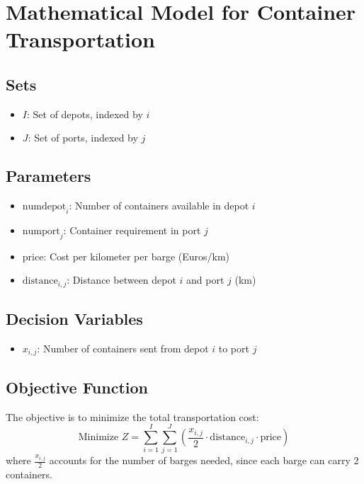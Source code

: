 \documentclass{article}
\begin{document}
\section*{Mathematical Model for Container Transportation}

\subsection*{Sets}
\begin{itemize}
    \item \( I \): Set of depots, indexed by \( i \)
    \item \( J \): Set of ports, indexed by \( j \)
\end{itemize}

\subsection*{Parameters}
\begin{itemize}
    \item \( \text{numdepot}_i \): Number of containers available in depot \( i \)
    \item \( \text{numport}_j \): Container requirement in port \( j \)
    \item \( \text{price} \): Cost per kilometer per barge (Euros/km)
    \item \( \text{distance}_{i,j} \): Distance between depot \( i \) and port \( j \) (km)
\end{itemize}

\subsection*{Decision Variables}
\begin{itemize}
    \item \( x_{i,j} \): Number of containers sent from depot \( i \) to port \( j \)
\end{itemize}

\subsection*{Objective Function}
The objective is to minimize the total transportation cost:
\[
\text{Minimize } Z = \sum_{i=1}^{I} \sum_{j=1}^{J} \left(\frac{x_{i,j}}{2} \cdot \text{distance}_{i,j} \cdot \text{price}\right)
\]
where \( \frac{x_{i,j}}{2} \) accounts for the number of barges needed, since each barge can carry 2 containers.
\end{document}
